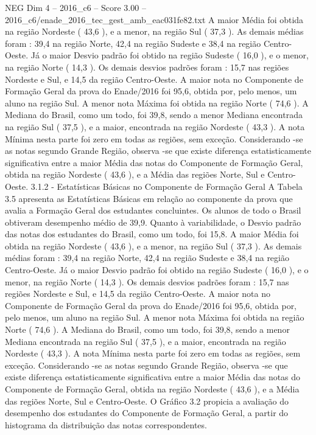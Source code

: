 \begin{textsample}{NEG Dim 4 – 2016\_c6 – Score 3.00 – 2016\_c6/enade\_2016\_tec\_gest\_amb\_eac031fe82.txt}
A maior Média foi obtida na região Nordeste ( 43,6 ), e a menor, na região Sul ( 37,3 ).
As demais médias foram : 39,4 na região Norte, 42,4 na região Sudeste e 38,4 na região Centro-Oeste.
Já o maior Desvio padrão foi obtido na região Sudeste ( 16,0 ), e o menor, na região Norte ( 14,3 ).
Os demais desvios padrões foram : 15,7 nas regiões Nordeste e Sul, e 14,5 da região Centro-Oeste.
A maior nota no Componente de Formação Geral da prova do Enade/2016 foi 95,6, obtida por, pelo menos, um aluno na região Sul.
A menor nota Máxima foi obtida na região Norte ( 74,6 ).
A Mediana do Brasil, como um todo, foi 39,8, sendo a menor Mediana encontrada na região Sul ( 37,5 ), e a maior, encontrada na região Nordeste ( 43,3 ).
A nota Mínima nesta parte foi zero em todas as regiões, sem exceção.
Considerando -se as notas segundo Grande Região, observa -se que existe diferença estatisticamente significativa entre a maior Média das notas do Componente de Formação Geral, obtida na região Nordeste ( 43,6 ), e a Média das regiões Norte, Sul e Centro-Oeste. 3.1.2 - Estatísticas Básicas no Componente de Formação Geral A Tabela 3.5 apresenta as Estatísticas Básicas em relação ao componente da prova que avalia a Formação Geral dos estudantes concluintes.
Os alunos de todo o Brasil obtiveram desempenho médio de 39,9.
Quanto à variabilidade, o Desvio padrão das notas dos estudantes do Brasil, como um todo, foi 15,8.
A maior Média foi obtida na região Nordeste ( 43,6 ), e a menor, na região Sul ( 37,3 ).
As demais médias foram : 39,4 na região Norte, 42,4 na região Sudeste e 38,4 na região Centro-Oeste.
Já o maior Desvio padrão foi obtido na região Sudeste ( 16,0 ), e o menor, na região Norte ( 14,3 ).
Os demais desvios padrões foram : 15,7 nas regiões Nordeste e Sul, e 14,5 da região Centro-Oeste.
A maior nota no Componente de Formação Geral da prova do Enade/2016 foi 95,6, obtida por, pelo menos, um aluno na região Sul.
A menor nota Máxima foi obtida na região Norte ( 74,6 ).
A Mediana do Brasil, como um todo, foi 39,8, sendo a menor Mediana encontrada na região Sul ( 37,5 ), e a maior, encontrada na região Nordeste ( 43,3 ).
A nota Mínima nesta parte foi zero em todas as regiões, sem exceção.
Considerando -se as notas segundo Grande Região, observa -se que existe diferença estatisticamente significativa entre a maior Média das notas do Componente de Formação Geral, obtida na região Nordeste ( 43,6 ), e a Média das regiões Norte, Sul e Centro-Oeste.
O Gráfico 3.2 propicia a avaliação do desempenho dos estudantes do Componente de Formação Geral, a partir do histograma da distribuição das notas correspondentes.

\end{textsample}
